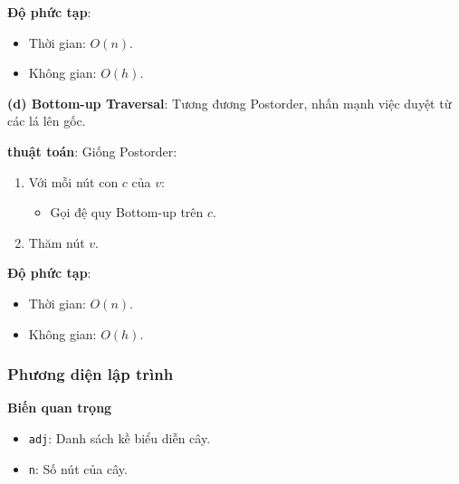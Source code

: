\documentclass[a4paper,12pt]{article}
\begin{document}
\textbf{Độ phức tạp}:
\begin{itemize}
    \item Thời gian: \( O(n) \).
    \item Không gian: \( O(h) \).
\end{itemize}

\textbf{(d) Bottom-up Traversal}: Tương đương Postorder, nhấn mạnh việc duyệt từ các lá lên gốc.

\textbf{thuật toán}: Giống Postorder:
\begin{enumerate}
    \item Với mỗi nút con \( c \) của \( v \):
        \begin{itemize}
            \item Gọi đệ quy Bottom-up trên \( c \).
        \end{itemize}
    \item Thăm nút \( v \).
\end{enumerate}

\textbf{Độ phức tạp}:
\begin{itemize}
    \item Thời gian: \( O(n) \).
    \item Không gian: \( O(h) \).
\end{itemize}

\subsubsection{Phương diện lập trình}

\textbf{Biến quan trọng}
\begin{itemize}
    \item \texttt{adj}: Danh sách kề biểu diễn cây.
    \item \texttt{n}: Số nút của cây.
\end{itemize}
\end{document}
